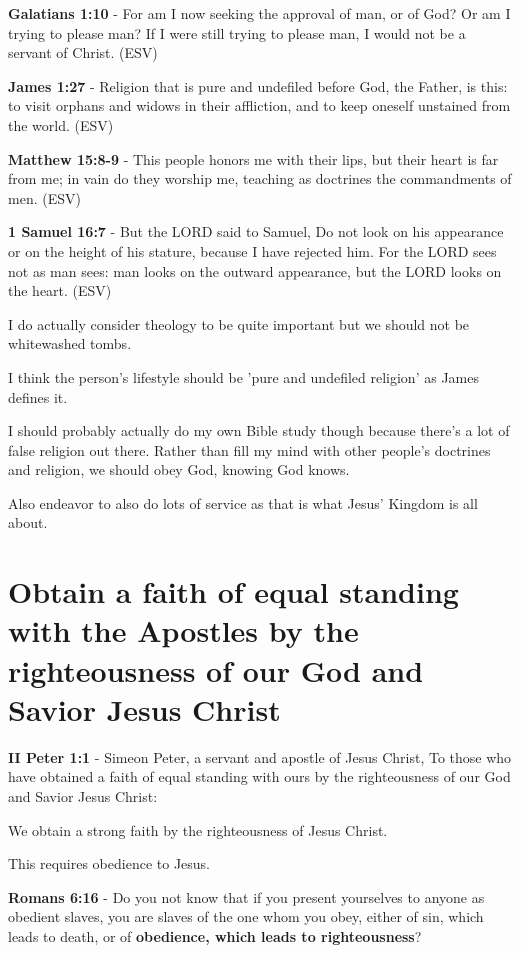 \documentclass[11pt]{article}
\begin{document}
\textbf{Galatians 1:10} - For am I now seeking the approval of man, or of God? Or am I trying to please man? If I were still trying to please man, I would not be a servant of Christ. (ESV)

\textbf{James 1:27} - Religion that is pure and undefiled before God, the Father, is this: to visit orphans and widows in their affliction, and to keep oneself unstained from the world. (ESV)

\textbf{Matthew 15:8-9} - This people honors me with their lips, but their heart is far from me; in vain do they worship me, teaching as doctrines the commandments of men. (ESV)

\textbf{1 Samuel 16:7} - But the LORD said to Samuel, Do not look on his appearance or on the height of his stature, because I have rejected him.  For the LORD sees not as man sees: man looks on the outward appearance, but the LORD looks on the heart.  (ESV)

I do actually consider theology to be quite important but we should not be whitewashed tombs.

I think the person's lifestyle should be 'pure and undefiled religion' as James defines it.

I should probably actually do my own Bible study though because there's a lot of false religion out there.
Rather than fill my mind with other people's doctrines and religion, we should obey God, knowing God knows.

Also endeavor to also do lots of service as that is what Jesus' Kingdom is all about.

\section{Obtain a faith of equal standing with the Apostles by the righteousness of our God and Savior Jesus Christ}
\label{sec:orgdac4d18}
\textbf{II Peter 1:1} - Simeon Peter, a servant and apostle of Jesus Christ, To those who have obtained a faith of equal standing with ours by the righteousness of our God and Savior Jesus Christ:

We obtain a strong faith by the righteousness of Jesus Christ.

This requires obedience to Jesus.

\textbf{Romans 6:16} - Do you not know that if you present yourselves to anyone as obedient slaves, you are slaves of the one whom you obey, either of sin, which leads to death, or of \textbf{obedience, which leads to righteousness}?
\end{document}

